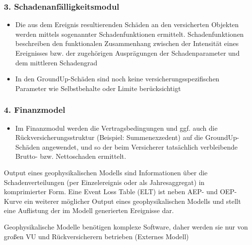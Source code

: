\documentclass[12pt]{report}
\theoremstyle{dotless}
\theoremstyle{definition}
\begin{document}
\subsubsection{3. Schadenanfälligkeitsmodul}
\begin{itemize}
\item Die aus dem Ereignis resultierenden Schäden an den versicherten Objekten werden mittels sogenannter Schadenfunktionen ermittelt. Schadenfunktionen beschreiben den funktionalen Zusammenhang zwischen der Intensität eines Ereignisses bzw. der zugehörigen Ausprägungen der Schadenparameter und dem mittleren Schadengrad
\item In den GroundUp-Schäden sind noch keine versicherungsspezifischen Parameter wie
Selbstbehalte oder Limite berücksichtigt
\end{itemize}

\subsubsection{4. Finanzmodel}
\begin{itemize}
\item Im Finanzmodul werden die Vertragsbedingungen und ggf. auch die Rückversicherungsstruktur (Beispiel: Summenexzedent) auf die GroundUp-Schäden angewendet, und so der beim Versicherer tatsächlich verbleibende Brutto- bzw. Nettoschaden ermittelt.
\end{itemize}

Output eines geophysikalischen Modells sind Informationen über die Schadenverteilungen (per
Einzelereignis oder als Jahresaggregat) in komprimierter Form. Eine Event Loss Table (ELT) ist
neben AEP- und OEP-Kurve ein weiterer möglicher Output eines geophysikalischen Modells und
stellt eine Auflistung der im Modell generierten Ereignisse dar.

Geophysikalische Modelle benötigen komplexe Software, daher werden sie nur von großen VU und Rückversicherern betrieben (Externes Modell)
\end{document}
